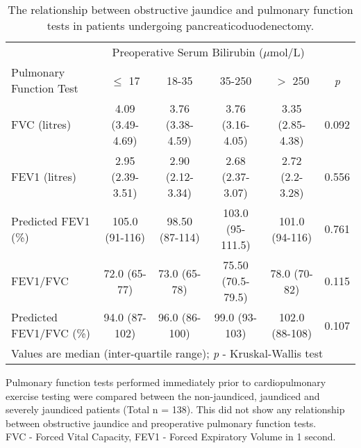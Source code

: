 \begin{sidewaystable}[p]
	\caption{The relationship  between obstructive jaundice and pulmonary function tests in patients undergoing pancreaticoduodenectomy.}
	\label{table:cpet_oj_pft}
	\centering
	\renewcommand{\arraystretch}{1.4} %
	\setlength{\tabcolsep}{9pt} %
	
	\begin{tabular}{|l| c c c c c|}
		\hline
		                        &       \multicolumn{4}{c}{Preoperative Serum Bilirubin ($\mu$mol/L)}        &  \\
		Pulmonary Function Test & $\leq$ 17        & 18-35            & 35-250            & $>$ 250          & \textit{p} \\ \hline
		FVC (litres)            & 4.09 (3.49-4.69) & 3.76 (3.38-4.59) & 3.76 (3.16-4.05)  & 3.35 (2.85-4.38) & 0.092      \\
		FEV1 (litres)           & 2.95 (2.39-3.51) & 2.90 (2.12-3.34) & 2.68 (2.37-3.07)  & 2.72 (2.2-3.28)  & 0.556      \\
		Predicted FEV1 (\%)     & 105.0 (91-116)   & 98.50 (87-114)   & 103.0 (95-111.5)  & 101.0 (94-116)   & 0.761      \\
		FEV1/FVC                & 72.0 (65-77)     & 73.0 (65-78)     & 75.50 (70.5-79.5) & 78.0 (70-82)     & 0.115      \\
		Predicted FEV1/FVC (\%) & 94.0 (87-102)    & 96.0 (86-100)    & 99.0 (93-103)     & 102.0 (88-108)   & 0.107      \\ \hline
		\multicolumn{6}{l}{Values are median (inter-quartile range); \textit{p} - Kruskal-Wallis test}
	\end{tabular}
	\medskip
	\begin{flushleft}
		Pulmonary function tests performed immediately prior to cardiopulmonary exercise testing were compared between the non-jaundiced, jaundiced and severely jaundiced patients (Total n = 138). This did not show any relationship between obstructive jaundice and preoperative pulmonary function tests. \\
		FVC - Forced Vital Capacity, FEV1 - Forced Expiratory Volume in 1 second.
	\end{flushleft}
\end{sidewaystable}



